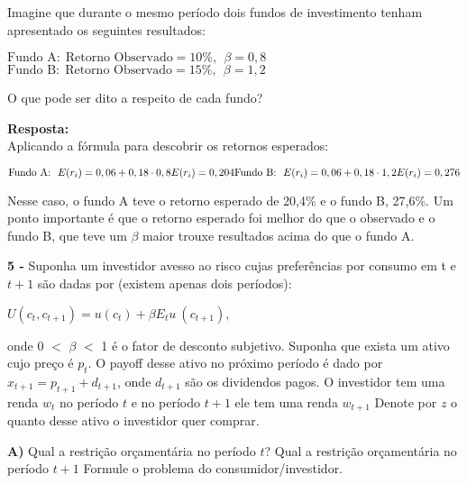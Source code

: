 Imagine que durante o mesmo período dois fundos de investimento tenham apresentado os seguintes resultados:

\singlespacing
\begin{center}
	$\text{Fundo A:} \ \ \text{Retorno Observado} = 10\%, \ \ \beta = 0,8$
	\\
	$\text{Fundo B:} \ \ \text{Retorno Observado} = 15\%, \ \ \beta = 1,2$
\end{center}

\singlespacing

O que pode ser dito a respeito de cada fundo?

\singlespacing

\textbf{Resposta:}
\\
Aplicando a fórmula para descobrir os retornos esperados:

\begin{equation}
\text{Fundo A:} \ \ E(r_{i}) = 0,06 + 0,18 \cdot 0,8
$$\\$$
E(r_{i}) = 0,204
$$\\$$
\text{Fundo B:} \ \ E(r_{i}) = 0,06 + 0,18 \cdot 1,2
$$\\$$
E(r_{i}) = 0,276
\end{equation}

Nesse caso, o fundo A teve o retorno esperado de 20,4\% e o fundo B, 27,6\%. Um ponto importante é que o retorno esperado foi melhor do que o observado e o fundo B, que teve um $\beta$ maior trouxe resultados acima do que o fundo A.

\singlespacing

\textbf{5 - } Suponha um investidor avesso ao risco cujas preferências por consumo em t e $t + 1$ são dadas por (existem apenas dois períodos):

\begin{center}
	$U(c_{t}, c_{t + 1}) = u(c_{t}) + \beta E_{t}u \ (c_{t + 1}),$
\end{center}

onde 0 $<$ $\beta$ $<$ 1 é o fator de desconto subjetivo. Suponha que exista um ativo cujo preço é $p_{t}$. O payoff desse ativo no próximo período é dado por $x_{t + 1} = p_{t + 1} + d_{t + 1}$, onde $d_{t + 1}$ são os dividendos pagos. O investidor tem uma renda $w_{t}$ no período $t$ e no período $t + 1$ ele tem uma renda $w_{t + 1}$ Denote por $z$ o quanto desse ativo o investidor quer comprar.

\singlespacing

\textbf{A)} Qual a restrição orçamentária no período $t$? Qual a restrição orçamentária no período $t + 1$ Formule o problema do consumidor/investidor.

